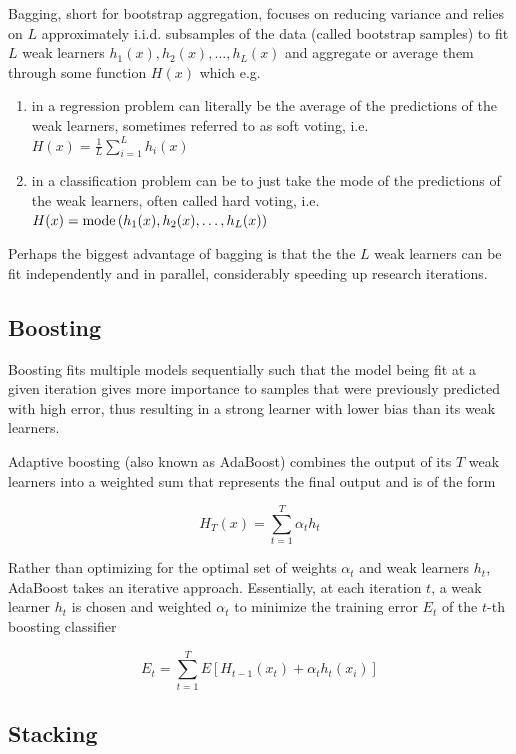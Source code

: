 Bagging, short for bootstrap aggregation, focuses on reducing variance and relies on $L$ approximately i.i.d. subsamples of the data (called bootstrap samples) to fit $L$ weak learners $h_1(x), h_2(x), \ldots, h_L(x)$ and aggregate or average them through some function $H(x)$ which e.g.

\begin{enumerate}
    \item in a regression problem can literally be the average of the predictions of the weak learners, sometimes referred to as soft voting, i.e. $H(x) = \frac{1}{L} \sum_{i=1}^{L} h_i(x)$
    \item in a classification problem can be to just take the mode of the predictions of the weak learners, often called hard voting, i.e. $H(x) = \operatorname*{mode}{(h_1(x), h_2(x), \ldots, h_L(x))}$
\end{enumerate}

Perhaps the biggest advantage of bagging is that the the $L$ weak learners can be fit independently and in parallel, considerably speeding up research iterations.

\subsection{Boosting}

Boosting fits multiple models sequentially such that the model being fit at a given iteration gives more importance to samples that were previously predicted with high error, thus resulting in a strong learner with lower bias than its weak learners.

Adaptive boosting (also known as AdaBoost) \cite{adaboost} combines the output of its $T$ weak learners into a weighted sum that represents the final output and is of the form

$$
H_T(x) = \sum_{t=1}^{T} \alpha_t h_t
$$

Rather than optimizing for the optimal set of weights $\alpha_t$ and weak learners $h_t$, AdaBoost takes an iterative approach. Essentially, at each iteration $t$, a weak learner $h_t$ is chosen and weighted $\alpha_t$ to minimize the training error $E_t$ of the $t$-th boosting classifier

$$
E_t = \sum_{t=1}^{T} E[H_{t-1}(x_t) + \alpha_t h_t(x_i)]
$$

\subsection{Stacking}

